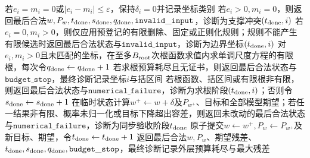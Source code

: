 \begin{AlgorithmContract}
\begin{algorithm}[H]
{{    若$e_i=m_i=0$或$|e_i-m_i|\le\varepsilon$，保持$\delta_i=0$并记录坐标类别\;
    若$e_i>0,m_i=0$，则返回最后合法$w,P_w,t_{\rm done},s_{\rm done},q_{\rm done},\mathtt{invalid\_input}$，诊断为支撑冲突$(t_{\rm done},i)$\;
    若$e_i=0,m_i>0$，则仅应用预登记的有限删除、固定或正则化规则；规则不能产生有限候选时返回最后合法状态与$\mathtt{invalid\_input}$，诊断为边界坐标$(t_{\rm done},i)$\;
    对$e_i,m_i>0$且未匹配的坐标，在至多$B_{\rm root}$次根函数求值内求单调尺度方程的有限根，每次令$q_{\rm done}\leftarrow q_{\rm done}+1$\;
    若求根预算耗尽且无证书，则返回最后合法状态与$\mathtt{budget\_stop}$，最终诊断记录坐标$i$与括区间\;
    若根函数、括区间或有限根非有限，则返回最后合法状态与$\mathtt{numerical\_failure}$，诊断为求根阶段$(t_{\rm done},i)$；否则令$s_{\rm done}\leftarrow s_{\rm done}+1$\;
  }
  在临时状态计算$w^+\leftarrow w+\delta$及$P_{w^+}$、目标和全部模型期望；若任一结果非有限、概率未归一化或目标下降超出容差，则返回未改动的最后合法状态与$\mathtt{numerical\_failure}$，诊断为同步验收阶段$t_{\rm done}$\;
  原子提交$w\leftarrow w^+,P_w\leftarrow P_{w^+}$及新目标、期望，令$t_{\rm done}\leftarrow t_{\rm done}+1$\;
}
返回最后合法$w,P_w$、期望残差、$t_{\rm done},s_{\rm done},q_{\rm done},\mathtt{budget\_stop}$，最终诊断记录外层预算耗尽与最大残差\;
\end{algorithm}
\end{AlgorithmContract}

